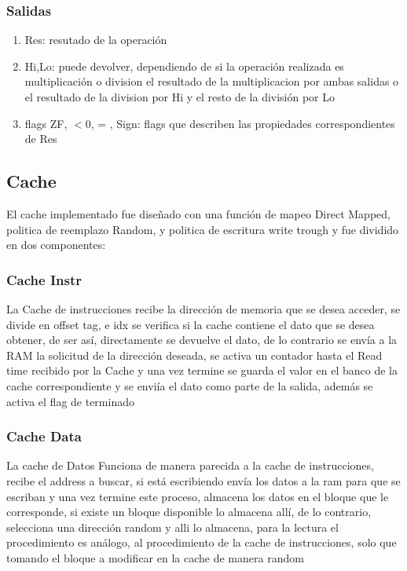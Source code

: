 \documentclass{article}
\begin{document}
            \subsubsection{Salidas}
                \begin{enumerate}
                    \item Res: resutado de la operaci\'on
                    \item Hi,Lo: puede devolver, dependiendo de si la operaci\'on realizada es multiplicaci\'on o division el resultado de la multiplicacion por ambas salidas o el resultado de la division por Hi y el resto de la divisi\'on por Lo
                    \item flags ZF, $<0$, = , Sign: flags que describen las propiedades correspondientes de Res
                \end{enumerate}

        \subsection{Cache}
        \label{sec:Cache}
            El cache implementado fue dise\~nado con una funci\'on de mapeo Direct Mapped, politica de reemplazo Random, y politica de escritura write trough y fue dividido en dos componentes:
            \subsubsection{Cache Instr}
                La Cache de instrucciones recibe la direcci\'on de memoria que se desea acceder, se divide en offset tag, e idx
                se verifica si la cache contiene el dato que se desea obtener, de ser as\'i, directamente se devuelve el dato, de lo contrario
                se env\'ia a la RAM la solicitud de la direcci\'on deseada, se activa un contador hasta el Read time recibido por la Cache y una vez termine
                se guarda el valor en el banco de la cache correspondiente y se envi\'ia el dato como parte de la salida, adem\'as se activa el flag de terminado
            
            \subsubsection{Cache Data}
                La cache de Datos Funciona de manera parecida a la cache de instrucciones, recibe el address a buscar, si est\'a escribiendo env\'ia los datos a la ram para que se escriban y una vez termine 
                este proceso, almacena los datos en el bloque que le corresponde, si existe un bloque disponible lo almacena all\'i, de lo contrario, selecciona una direcci\'on random y alli lo almacena, para la 
                lectura el procedimiento es an\'alogo, al procedimiento de la cache de instrucciones, solo que tomando el bloque a modificar en la cache de manera random     
\end{document}
